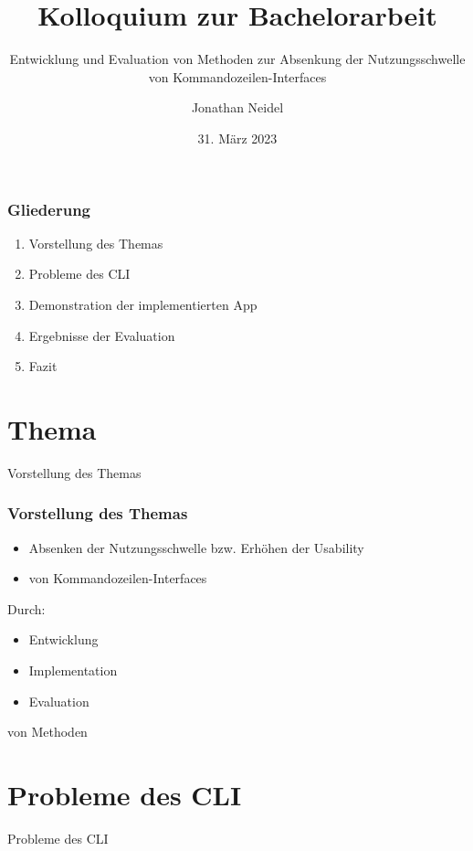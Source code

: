 \documentclass{beamer}
\title{Kolloquium zur Bachelorarbeit}
\subtitle{Entwicklung und Evaluation von Methoden zur Absenkung der Nutzungsschwelle von Kommandozeilen-Interfaces}
\author{Jonathan Neidel}
\date{31. März 2023}
\institute{HTW Berlin, Angewandte Informatik}
\begin{document}
\frame{\titlepage}

\begin{frame}
  \frametitle{Gliederung}

  \begin{enumerate}
    \item Vorstellung des Themas
    \item Probleme des CLI
    \item Demonstration der implementierten App
    \item Ergebnisse der Evaluation
    \item Fazit
  \end{enumerate}
\end{frame}

\section{Thema}
\begin{frame}
  \begin{center}
    {\Huge Vorstellung des Themas}
  \end{center}
\end{frame}

\begin{frame}
  \frametitle{Vorstellung des Themas}

  \begin{itemize}
    \item Absenken der Nutzungsschwelle bzw. Erhöhen der Usability
    \item von Kommandozeilen-Interfaces
  \end{itemize}

  \bigskip

  Durch:
  \begin{itemize}
    \item Entwicklung
    \item Implementation
    \item Evaluation
  \end{itemize}
  von Methoden
\end{frame}

\section{Probleme des CLI}
\begin{frame}
  \begin{center}
    {\Huge Probleme des CLI}
  \end{center}
\end{frame}
\end{document}
